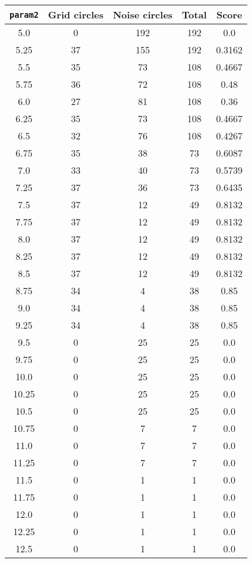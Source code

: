 \documentclass[letterpaper, 12pt]{article}
\begin{document}
\begin{longtable}{|c|c|c|c|c|}
\hline
\textbf{\texttt{param2}} & \textbf{Grid circles} & \textbf{Noise circles} & \textbf{Total} & \textbf{Score} \\
\hline
5.0 & 0 & 192 & 192 & 0.0 \\
\hline
5.25 & 37 & 155 & 192 & 0.3162 \\
\hline
5.5 & 35 & 73 & 108 & 0.4667 \\
\hline
5.75 & 36 & 72 & 108 & 0.48 \\
\hline
6.0 & 27 & 81 & 108 & 0.36 \\
\hline
6.25 & 35 & 73 & 108 & 0.4667 \\
\hline
6.5 & 32 & 76 & 108 & 0.4267 \\
\hline
6.75 & 35 & 38 & 73 & 0.6087 \\
\hline
7.0 & 33 & 40 & 73 & 0.5739 \\
\hline
7.25 & 37 & 36 & 73 & 0.6435 \\
\hline
7.5 & 37 & 12 & 49 & 0.8132 \\
\hline
7.75 & 37 & 12 & 49 & 0.8132 \\
\hline
8.0 & 37 & 12 & 49 & 0.8132 \\
\hline
8.25 & 37 & 12 & 49 & 0.8132 \\
\hline
8.5 & 37 & 12 & 49 & 0.8132 \\
\hline
8.75 & 34 & 4 & 38 & 0.85 \\
\hline
9.0 & 34 & 4 & 38 & 0.85 \\
\hline
9.25 & 34 & 4 & 38 & 0.85 \\
\hline
9.5 & 0 & 25 & 25 & 0.0 \\
\hline
9.75 & 0 & 25 & 25 & 0.0 \\
\hline
10.0 & 0 & 25 & 25 & 0.0 \\
\hline
10.25 & 0 & 25 & 25 & 0.0 \\
\hline
10.5 & 0 & 25 & 25 & 0.0 \\
\hline
10.75 & 0 & 7 & 7 & 0.0 \\
\hline
11.0 & 0 & 7 & 7 & 0.0 \\
\hline
11.25 & 0 & 7 & 7 & 0.0 \\
\hline
11.5 & 0 & 1 & 1 & 0.0 \\
\hline
11.75 & 0 & 1 & 1 & 0.0 \\
\hline
12.0 & 0 & 1 & 1 & 0.0 \\
\hline
12.25 & 0 & 1 & 1 & 0.0 \\
\hline
12.5 & 0 & 1 & 1 & 0.0 \\
\hline

\end{longtable}
\end{document}
